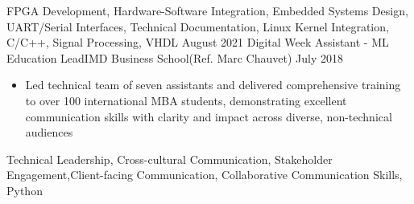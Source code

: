 \begin{experiences}
{                    }
                    {FPGA Development, Hardware-Software Integration, Embedded Systems Design, UART/Serial Interfaces, Technical Documentation, Linux Kernel Integration, C/C++, Signal Processing, VHDL}
  \emptySeparator
\experience
    {August 2021}   {Digital Week Assistant - ML Education Lead}{IMD Business School}{(Ref. Marc Chauvet)}
    {July 2018} {
                      \begin{itemize}
                        \item Led technical team of seven assistants and delivered comprehensive training to over 100 international MBA students, demonstrating excellent communication skills with clarity and impact across diverse, non-technical audiences
                      \end{itemize}
                    }
                    {Technical Leadership, Cross-cultural Communication, Stakeholder Engagement,Client-facing Communication, Collaborative Communication Skills, Python}
  \emptySeparator
\end{experiences}
